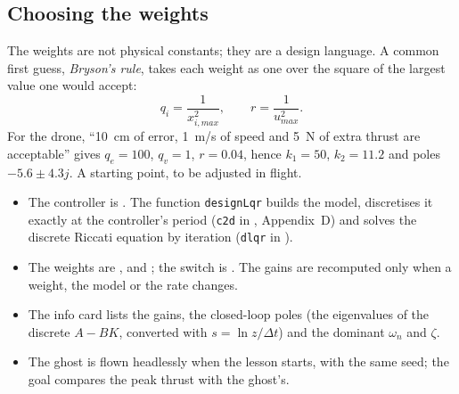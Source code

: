 \subsection{Choosing the weights}
The weights are not physical constants; they are a design language. A common first guess, \emph{Bryson's rule}, takes each weight as one over the square of the largest value one would accept:
\begin{equation}\label{eq:lqr-bryson}
  q_i = \frac{1}{x_{i,max}^2}, \qquad r = \frac{1}{u_{max}^2} .
\end{equation}
For the drone, \enquote{\SI{10}{cm} of error, \SI{1}{m/s} of speed and \SI{5}{N} of extra thrust are acceptable} gives $q_e = 100$, $q_v = 1$, $r = 0.04$, hence $k_1 = 50$, $k_2 = 11.2$ and poles $-5.6 \pm 4.3j$. A starting point, to be adjusted in flight.


\begin{inapp}
\begin{itemize}[leftmargin=1.2em]
  \item The controller is . The function \texttt{designLqr} builds the model, discretises it exactly at the controller's period (\texttt{c2d} in , Appendix~D) and solves the discrete Riccati equation by iteration (\texttt{dlqr} in ).
  \item The weights are ,  and ; the switch is . The gains are recomputed only when a weight, the model or the rate changes.
  \item The info card lists the gains, the closed-loop poles (the eigenvalues of the discrete $A - BK$, converted with $s = \ln z/\Delta t$) and the dominant $\omega_n$ and $\zeta$.
  \item The ghost is flown headlessly when the lesson starts, with the same seed; the goal compares the peak thrust with the ghost's.
\end{itemize}
\end{inapp}

